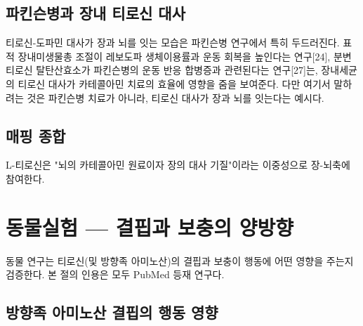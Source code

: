 \documentclass[12pt,oneside]{book}
\begin{document}
\subsection{파킨슨병과 장내 티로신 대사}

티로신-도파민 대사가 장과 뇌를 잇는 모습은 파킨슨병 연구에서 특히 두드러진다. 표적 장내미생물총 조절이 레보도파 생체이용률과 운동 회복을 높인다는 연구[24], 분변 티로신 탈탄산효소가 파킨슨병의 운동 반응 합병증과 관련된다는 연구[27]는, 장내세균의 티로신 대사가 카테콜아민 치료의 효율에 영향을 줌을 보여준다. 다만 여기서 말하려는 것은 파킨슨병 치료가 아니라, 티로신 대사가 장과 뇌를 잇는다는 예시다.

\subsection{매핑 종합}

\vspace{2pt}\vspace{3pt}

L-티로신은 "뇌의 카테콜아민 원료이자 장의 대사 기질"이라는 이중성으로 장-뇌축에 참여한다.

\section{동물실험 — 결핍과 보충의 양방향}

동물 연구는 티로신(및 방향족 아미노산)의 결핍과 보충이 행동에 어떤 영향을 주는지 검증한다. 본 절의 인용은 모두 PubMed 등재 연구다.

\subsection{방향족 아미노산 결핍의 행동 영향}
\end{document}
